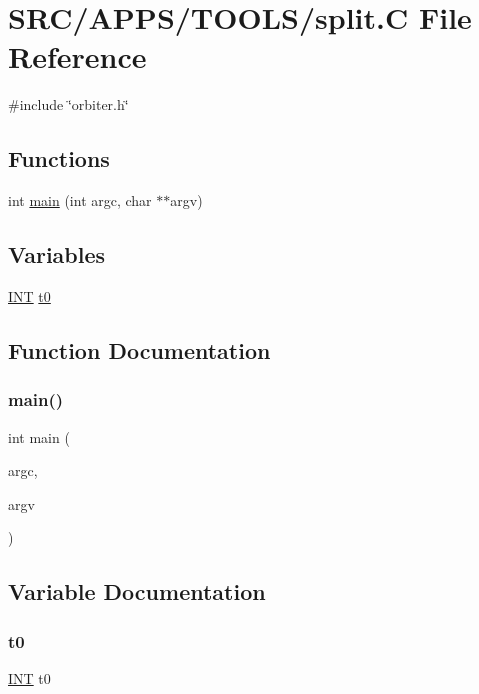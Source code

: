 \hypertarget{split_8_c}{}\section{S\+R\+C/\+A\+P\+P\+S/\+T\+O\+O\+L\+S/split.C File Reference}
\label{split_8_c}
{\ttfamily \#include \char`\"{}orbiter.\+h\char`\"{}}\newline
\subsection*{Functions}
\begin{DoxyCompactItemize}
\item 
int \mbox{\hyperlink{split_8_c_a3c04138a5bfe5d72780bb7e82a18e627}{main}} (int argc, char $\ast$$\ast$argv)
\end{DoxyCompactItemize}
\subsection*{Variables}
\begin{DoxyCompactItemize}
\item 
\mbox{\hyperlink{galois_8h_a09fddde158a3a20bd2dcadb609de11dc}{I\+NT}} \mbox{\hyperlink{split_8_c_a4268f4fe222ffb119218a0199f5e1904}{t0}}
\end{DoxyCompactItemize}


\subsection{Function Documentation}
\mbox{\label{split_8_c_a3c04138a5bfe5d72780bb7e82a18e627}} 
\subsubsection{\texorpdfstring{main()}{main()}}
{\footnotesize\ttfamily int main (\begin{DoxyParamCaption}\item[{int}]{argc,  }\item[{char $\ast$$\ast$}]{argv }\end{DoxyParamCaption})}



\subsection{Variable Documentation}
\mbox{\label{split_8_c_a4268f4fe222ffb119218a0199f5e1904}} 
\subsubsection{\texorpdfstring{t0}{t0}}
{\footnotesize\ttfamily \mbox{\hyperlink{galois_8h_a09fddde158a3a20bd2dcadb609de11dc}{I\+NT}} t0}

